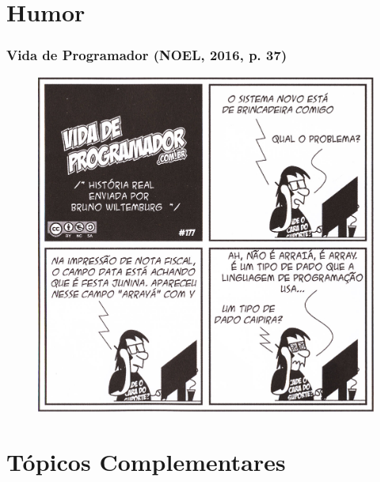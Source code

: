 \documentclass[xcolor={dvipsnames,table},aspectratio=169]{beamer}
\begin{document}
\section{Humor}

\begin{frame}\frametitle{Vida de Programador {\tiny (NOEL, 2016, p. 37)}}
\begin{figure}[h]
	\includegraphics[height=0.7\paperheight,center]{pucrs-ep-fprog-unidade_06-arrays-laminas-vida_de_programador.jpg}
\end{figure}
\end{frame}

\section{Tópicos Complementares}
\end{document}
